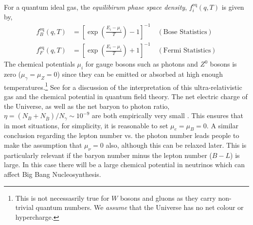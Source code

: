 \documentclass[11pt]{article}
\numberwithin{equation}{section}
\numberwithin{figure}{section}
\numberwithin{table}{section}
\begin{document}
For a quantum ideal gas, the \textit{equilibirum phase space density}, $f^{\mathrm{eq}}_i(q, T)$ is given by,
\begin{align}
f_B^{\mathrm{eq}}(q, T) &= \left[\exp\left(\frac{E_i - \mu_i}{T}\right) - 1\right]^{-1} \quad \mathrm{(Bose \,\, Statistics)} \\
f_F^{\mathrm{eq}}(q, T) &= \left[\exp\left(\frac{E_i - \mu_i}{T}\right) + 1\right]^{-1} \quad \mathrm{(Fermi \,\, Statistics)}
\end{align}
The chemical potentials $\mu_i$ for gauge bosons such as photons and $Z^0$ bosons is zero ($\mu_\gamma = \mu_Z = 0$) since they can be emitted or absorbed at high enough temperatures.\footnote{This is not necessasrily true for $W$ bosons and gluons as they carry non-trivial quantum numbers. We \textit{assume} that the Universe has no net colour or hypercharge.} See \citet{Haber:1981fg} for a discussion of the interpretation of this ultra-relativistic gas and the chemical potential in quantum field theory. The net electric charge of the Universe, as well as the net baryon to photon ratio, $\eta = (N_B + N_{\bar{B}})/N_\gamma \sim 10^{-9}$ are both empirically very small \citep{Steigman:1979kw}. This ensures that in most situations, for simplicity, it is reasonable to set $\mu_e = \mu_B = 0$. A similar conclusion regarding the lepton number vs. the photon number leads people to make the assumption that $\mu_\nu = 0$ also, although this can be relaxed later. This is particularly relevant if the baryon number minus the lepton number ($B - L$) is large. In this case there will be a large chemical potential in neutrinos which can affect Big Bang Nucleosynthesis.
\end{document}
